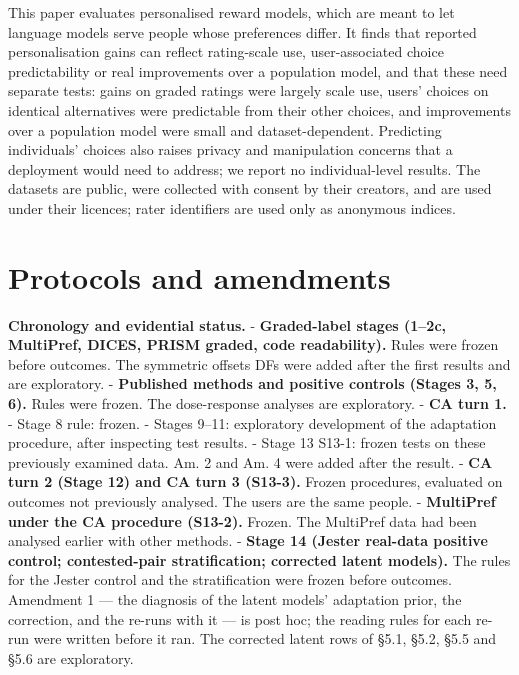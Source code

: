 \documentclass{article}
\begin{document}
This paper evaluates personalised reward models, which are meant to let language models serve people whose preferences differ. It finds that reported personalisation gains can reflect rating-scale use, user-associated choice predictability or real improvements over a population model, and that these need separate tests: gains on graded ratings were largely scale use, users' choices on identical alternatives were predictable from their other choices, and improvements over a population model were small and dataset-dependent. Predicting individuals' choices also raises privacy and manipulation concerns that a deployment would need to address; we report no individual-level results. The datasets are public, were collected with consent by their creators, and are used under their licences; rater identifiers are used only as anonymous indices.



\newpage
\appendix
\section{Protocols and amendments}

\textbf{Chronology and evidential status.} - \textbf{Graded-label stages (1--2c, MultiPref, DICES, PRISM graded, code readability).} Rules were frozen before outcomes. The symmetric offsets DFs were added after the first results and are exploratory. - \textbf{Published methods and positive controls (Stages 3, 5, 6).} Rules were frozen. The dose-response analyses are exploratory. - \textbf{CA turn 1.} - Stage 8 rule: frozen. - Stages 9--11: exploratory development of the adaptation procedure, after inspecting test results. - Stage 13 S13-1: frozen tests on these previously examined data. Am. 2 and Am. 4 were added after the result. - \textbf{CA turn 2 (Stage 12) and CA turn 3 (S13-3).} Frozen procedures, evaluated on outcomes not previously analysed. The users are the same people. - \textbf{MultiPref under the CA procedure (S13-2).} Frozen. The MultiPref data had been analysed earlier with other methods. - \textbf{Stage 14 (Jester real-data positive control; contested-pair stratification; corrected latent models).} The rules for the Jester control and the stratification were frozen before outcomes. Amendment 1 --- the diagnosis of the latent models' adaptation prior, the correction, and the re-runs with it --- is post hoc; the reading rules for each re-run were written before it ran. The corrected latent rows of \S{}5.1, \S{}5.2, \S{}5.5 and \S{}5.6 are exploratory.
\end{document}
